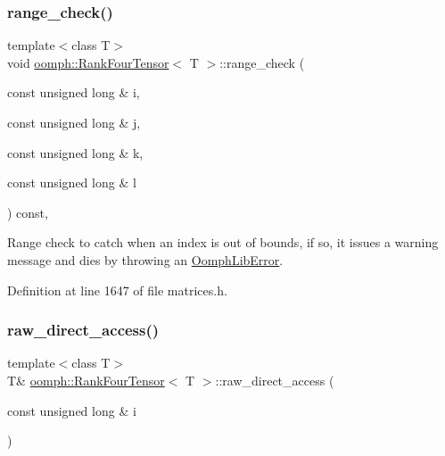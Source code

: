 \subsubsection{\texorpdfstring{range\+\_\+check()}{range\_check()}}
{\footnotesize\ttfamily template$<$class T$>$ \\
void \hyperlink{classoomph_1_1RankFourTensor}{oomph\+::\+Rank\+Four\+Tensor}$<$ T $>$\+::range\+\_\+check (\begin{DoxyParamCaption}\item[{const unsigned long \&}]{i,  }\item[{const unsigned long \&}]{j,  }\item[{const unsigned long \&}]{k,  }\item[{const unsigned long \&}]{l }\end{DoxyParamCaption}) const\hspace{0.3cm}{\ttfamily [inline]}, {\ttfamily [private]}}



Range check to catch when an index is out of bounds, if so, it issues a warning message and dies by throwing an {\ttfamily \hyperlink{classoomph_1_1OomphLibError}{Oomph\+Lib\+Error}}. 



Definition at line 1647 of file matrices.\+h.

\mbox{\label{classoomph_1_1RankFourTensor_a07c6ce750dba7430ef8215bbd1f6a307}} 
\subsubsection{\texorpdfstring{raw\+\_\+direct\+\_\+access()}{raw\_direct\_access()}\hspace{0.1cm}{\footnotesize\ttfamily [1/2]}}
{\footnotesize\ttfamily template$<$class T$>$ \\
T\& \hyperlink{classoomph_1_1RankFourTensor}{oomph\+::\+Rank\+Four\+Tensor}$<$ T $>$\+::raw\+\_\+direct\+\_\+access (\begin{DoxyParamCaption}\item[{const unsigned long \&}]{i }\end{DoxyParamCaption})\hspace{0.3cm}{\ttfamily [inline]}}



